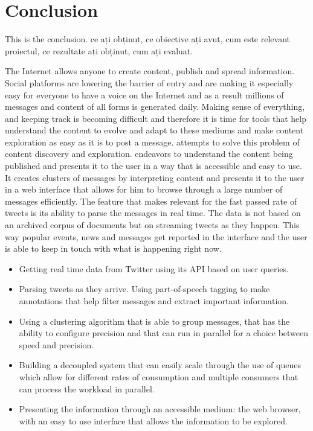 \chapter{Conclusion}
\label{chapter:conclusion}

This is the conclusion.  ce ați obținut, ce obiective ați avut, cum este relevant proiectul, ce rezultate ați obținut, cum ați evaluat.

The Internet allows anyone to create content, publish and spread information. Social platforms are lowering the barrier of entry and are making it especially easy for everyone to have a voice on the Internet and as a result millions of messages and content of all forms is generated daily. Making sense of everything, and keeping track is becoming difficult and therefore it is time for tools that help understand the content to evolve and adapt to these mediums and make content exploration as easy as it is to post a message.
\newline
{\project}  attempts to solve this problem of content discovery and exploration. {\project}  endeavors to understand the content being published and presents it to the user in a way that is accessible and easy to use. It creates clusters of messages by interpreting content and presents it to the user in a web interface that allows for him to browse through a large number of messages efficiently.
\newline
The feature that makes {\project}  relevant for the fast passed rate of tweets is its ability to parse the messages in real time. The data is not based on an archived corpus of documents but on streaming tweets as they happen. This way popular events, news and messages get reported in the interface and the user is able to keep in touch with what is happening right now.
\newline
\begin{itemize}
	\item Getting real time data from Twitter using its API based on user queries.
	\item Parsing tweets as they arrive. Using part-of-speech tagging to make annotations that help filter messages and extract important information.
	\item Using a clustering algorithm that is able to group messages, that has the ability to configure precision and that can run in parallel for a choice between speed and precision. 
	\item Building a decoupled system that can easily scale through the use of queues which allow for different rates of consumption and multiple consumers that can process the workload in parallel.
	\item Presenting the information through an accessible medium: the web browser, with an easy to use interface that allows the information to be explored.
\end{itemize}